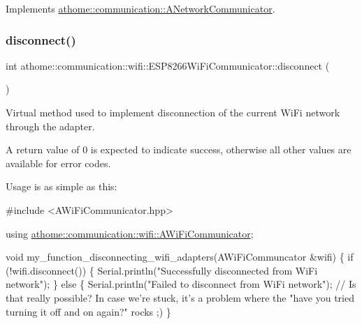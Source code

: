 Implements \mbox{\hyperlink{classathome_1_1communication_1_1_a_network_communicator_a370176dae8f38225446e83a132dbcff7}{athome\+::communication\+::\+A\+Network\+Communicator}}.

\mbox{\label{classathome_1_1communication_1_1wifi_1_1_e_s_p8266_wi_fi_communicator_a7e53e10b858aebc5e7c6c0ea6007f84a}} 
\subsubsection{\texorpdfstring{disconnect()}{disconnect()}}
{\footnotesize\ttfamily int athome\+::communication\+::wifi\+::\+E\+S\+P8266\+Wi\+Fi\+Communicator\+::disconnect (\begin{DoxyParamCaption}{ }\end{DoxyParamCaption})\hspace{0.3cm}{\ttfamily [virtual]}}

Virtual method used to implement disconnection of the current Wi\+Fi network through the adapter.

A return value of 0 is expected to indicate success, otherwise all other values are available for error codes.

Usage is as simple as this\+:


\begin{DoxyCode}
\textcolor{preprocessor}{#include <AWiFiCommunicator.hpp>}

\textcolor{keyword}{using} \mbox{\hyperlink{classathome_1_1communication_1_1wifi_1_1_a_wi_fi_communicator}{athome::communication::wifi::AWiFiCommunicator}};

\textcolor{keywordtype}{void} my\_function\_disconnecting\_wifi\_adapters(AWiFiCommuncator &wifi) \{
  \textcolor{keywordflow}{if} (!wifi.disconnect()) \{
    Serial.println(\textcolor{stringliteral}{"Successfully disconnected from WiFi network"});
  \} \textcolor{keywordflow}{else} \{
    Serial.println(\textcolor{stringliteral}{"Failed to disconnect from WiFi network"}); \textcolor{comment}{// Is that}
really possible? In \textcolor{keywordflow}{case} we\textcolor{stringliteral}{'re stuck, it'}s a problem where the \textcolor{stringliteral}{"have you}
\textcolor{stringliteral}{tried turning it off and on again?"} rocks ;)
\}
\end{DoxyCode}
 

